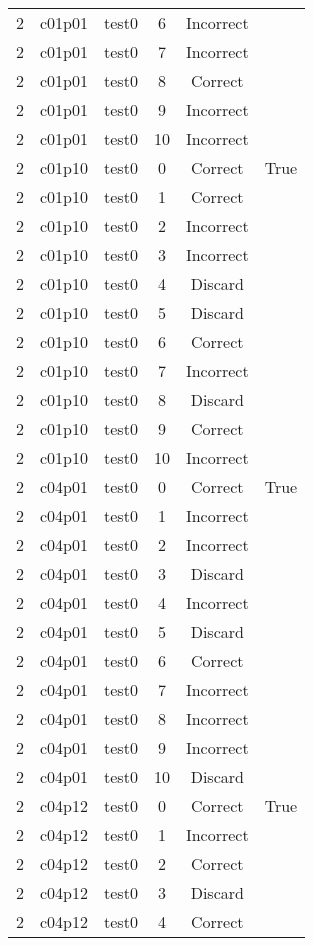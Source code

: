\begin{longtable}{|c|c|c|c|c|c|}
2 & c01p01 & test0 & 6 & Incorrect &  \\ 
2 & c01p01 & test0 & 7 & Incorrect &  \\ 
2 & c01p01 & test0 & 8 & Correct &  \\ 
2 & c01p01 & test0 & 9 & Incorrect &  \\ 
2 & c01p01 & test0 & 10 & Incorrect &  \\ 
2 & c01p10 & test0 & 0 & Correct & True \\ 
2 & c01p10 & test0 & 1 & Correct &  \\ 
2 & c01p10 & test0 & 2 & Incorrect &  \\ 
2 & c01p10 & test0 & 3 & Incorrect &  \\ 
2 & c01p10 & test0 & 4 & Discard &  \\ 
2 & c01p10 & test0 & 5 & Discard &  \\ 
2 & c01p10 & test0 & 6 & Correct &  \\ 
2 & c01p10 & test0 & 7 & Incorrect &  \\ 
2 & c01p10 & test0 & 8 & Discard &  \\ 
2 & c01p10 & test0 & 9 & Correct &  \\ 
2 & c01p10 & test0 & 10 & Incorrect &  \\ 
2 & c04p01 & test0 & 0 & Correct & True \\ 
2 & c04p01 & test0 & 1 & Incorrect &  \\ 
2 & c04p01 & test0 & 2 & Incorrect &  \\ 
2 & c04p01 & test0 & 3 & Discard &  \\ 
2 & c04p01 & test0 & 4 & Incorrect &  \\ 
2 & c04p01 & test0 & 5 & Discard &  \\ 
2 & c04p01 & test0 & 6 & Correct &  \\ 
2 & c04p01 & test0 & 7 & Incorrect &  \\ 
2 & c04p01 & test0 & 8 & Incorrect &  \\ 
2 & c04p01 & test0 & 9 & Incorrect &  \\ 
2 & c04p01 & test0 & 10 & Discard &  \\ 
2 & c04p12 & test0 & 0 & Correct & True \\ 
2 & c04p12 & test0 & 1 & Incorrect &  \\ 
2 & c04p12 & test0 & 2 & Correct &  \\ 
2 & c04p12 & test0 & 3 & Discard &  \\ 
2 & c04p12 & test0 & 4 & Correct &  \\ 

\end{longtable}
